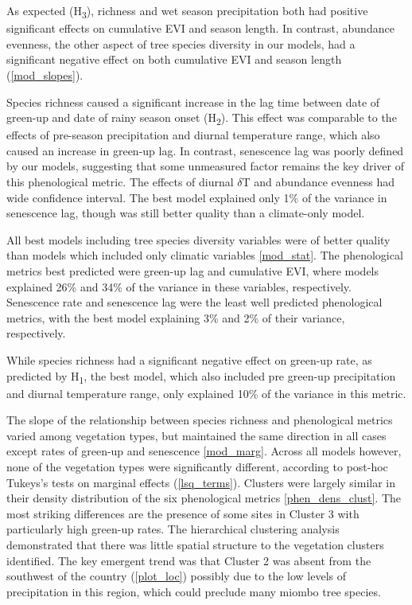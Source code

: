 \documentclass[11pt,a4paper]{article}
\begin{document}
As expected (H\textsubscript{3}), richness and wet season precipitation both had positive significant effects on cumulative EVI and season length. In contrast, abundance evenness, the other aspect of tree species diversity in our models, had a significant negative effect on both cumulative EVI and season length (\autoref{mod_slopes}).

Species richness caused a significant increase in the lag time between date of green-up and date of rainy season onset (H\textsubscript{2}). This effect was comparable to the effects of pre-season precipitation and diurnal temperature range, which also caused an increase in green-up lag. In contrast, senescence lag was poorly defined by our models, suggesting that some unmeasured factor remains the key driver of this phenological metric. The effects of diurnal $\delta$T and abundance evenness had wide confidence interval. The best model explained only 1\% of the variance in senescence lag, though was still better quality than a climate-only model.

All best models including tree species diversity variables were of better quality than models which included only climatic variables \autoref{mod_stat}. The phenological metrics best predicted were green-up lag and cumulative EVI, where models explained 26\% and 34\% of the variance in these variables, respectively. Senescence rate and senescence lag were the least well predicted phenological metrics, with the best model explaining 3\% and 2\% of their variance, respectively.

While species richness had a significant negative effect on green-up rate, as predicted by H\textsubscript{1}, the best model, which also included pre green-up precipitation and diurnal temperature range, only explained 10\% of the variance in this metric. 

The slope of the relationship between species richness and phenological metrics varied among vegetation types, but maintained the same direction in all cases except rates of green-up and senescence \autoref{mod_marg}. Across all models however, none of the vegetation types were significantly different, according to post-hoc Tukeys's tests on marginal effects (\autoref{lsq_terms}). Clusters were largely similar in their density distribution of the six phenological metrics \autoref{phen_dens_clust}. The most striking differences are the presence of some sites in Cluster 3 with particularly high green-up rates. The hierarchical clustering analysis demonstrated that there was little spatial structure to the vegetation clusters identified. The key emergent trend was that Cluster 2 was absent from the southwest of the country (\autoref{plot_loc}) possibly due to the low levels of precipitation in this region, which could preclude many miombo tree species.
\end{document}
